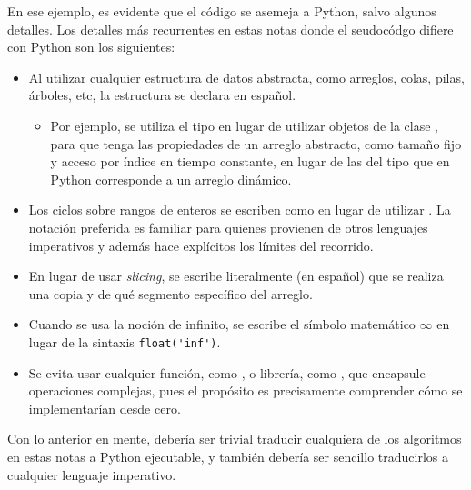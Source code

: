 En ese ejemplo, es evidente que el código se asemeja a Python, salvo algunos detalles. Los detalles más recurrentes en estas notas donde el seudocódgo difiere con Python son los siguientes:
\begin{itemize}
  \item Al utilizar cualquier estructura de datos abstracta, como arreglos, colas, pilas, árboles, etc, la estructura se declara en español.
  \begin{itemize}
    \item Por ejemplo, se utiliza el tipo  en lugar de utilizar objetos de la clase , para que tenga las propiedades de un arreglo abstracto, como tamaño fijo y acceso por índice en tiempo constante, en lugar de las del tipo  que en Python corresponde a un arreglo dinámico.
  \end{itemize}
  \item Los ciclos sobre rangos de enteros se escriben como  en lugar de utilizar . La notación preferida es familiar para quienes provienen de otros lenguajes imperativos y además hace explícitos los límites del recorrido.
  \item En lugar de usar \textit{slicing}, se escribe literalmente (en español) que se realiza una copia y de qué segmento específico del arreglo.
  \item Cuando se usa la noción de infinito, se escribe el símbolo matemático $\infty$ en lugar de la sintaxis \verb|float('inf')|.
  \item Se evita usar cualquier función, como , o librería, como , que encapsule operaciones complejas, pues el propósito es precisamente comprender cómo se implementarían desde cero.
\end{itemize}
Con lo anterior en mente, debería ser trivial traducir cualquiera de los algoritmos en estas notas a Python ejecutable, y también debería ser sencillo traducirlos a cualquier lenguaje imperativo.